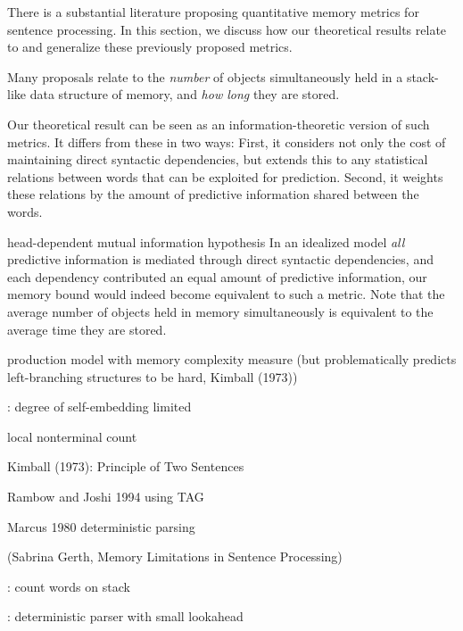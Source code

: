 There is a substantial literature proposing quantitative memory metrics for sentence processing.
In this section, we discuss how our theoretical results relate to and generalize these previously proposed metrics.

Many proposals relate to the \emph{number} of objects simultaneously held in a stack-like data structure of memory, and \emph{how long} they are stored.

Our theoretical result can be seen as an information-theoretic version of such metrics.
It differs from these in two ways:
First, it considers not only the cost of maintaining direct syntactic dependencies, but extends this to any statistical relations between words that can be exploited for prediction.
Second, it weights these relations by the amount of predictive information shared between the words.

head-dependent mutual information hypothesis
In an idealized model \emph{all} predictive information is mediated through direct syntactic dependencies, and each dependency contributed an equal amount of predictive information, our memory bound would indeed become equivalent to such a metric.
Note that the average number of objects held in memory simultaneously is equivalent to the average time they are stored.



\cite{yngve1960model} production model with memory complexity measure (but problematically predicts left-branching structures to be hard, Kimball (1973))

\cite{miller-finitary-1963}: degree of self-embedding limited

\cite{frazier1985syntactic} local nonterminal count

Kimball (1973): Principle of Two Sentences

Rambow and Joshi 1994 using TAG

Marcus 1980 deterministic parsing

(Sabrina Gerth, Memory Limitations in Sentence Processing)

\cite{gerth2009unifying}


\cite{wanner1978atn}
\cite{frazier1978sausage}

\cite{rambow201512}: count words on stack

\cite{boston2012computational}

\cite{just1992capacity}

\cite{marcus1978theory}: deterministic parser with small lookahead

